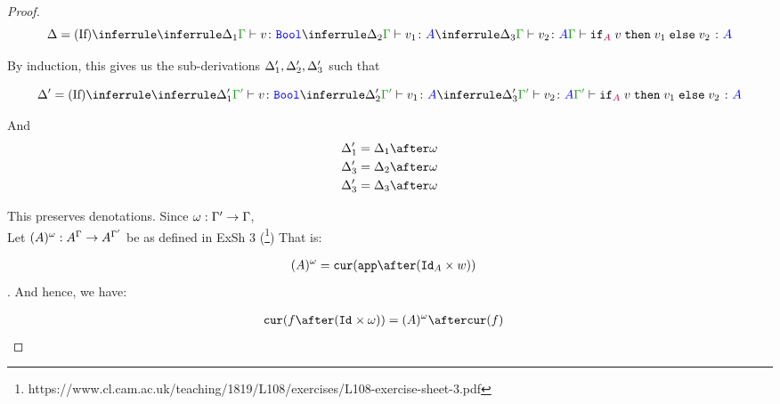 \documentclass{report}
\begin{document}
\begin{framed}
\begin{proof}
        
        \begin{equation}
            \D = \ntreeruleIII{\vif}{
                \treeruleI{\D_1}{\typerelation{\G}{v}{\B}}
                }{
                \treeruleI{\D_2}{\typerelation{\G}{v_1}{ A}}
                }{
                \treeruleI{\D_3}{\typerelation{\G}{v_2}{ A}}
            }{
                \typerelation{\G}{\pifthenelse{A}{v}{v_1}{v_2}}{ A}
            }
        \end{equation}
        
        By induction, this gives us the sub-derivations $\Delta_1', \Delta_2', \Delta_3'$ such that
        
        \begin{equation}
            \D' = \ntreeruleIII{\vif}{
                \treeruleI{\D_1'}{\typerelation{\G'}{v}{\B}}
                }{
                \treeruleI{\D_2'}{\typerelation{\G'}{v_1}{ A}}
                }{
                \treeruleI{\D_3'}{\typerelation{\G'}{v_2}{ A}}
            }{
                \typerelation{\G'}{\pifthenelse{A}{v}{v_1}{v_2}}{ A}
            }
        \end{equation}
        
        And 
        \begin{align*}
            \D_1' & =\D_1 \after \w\\
            \D_3' & =\D_2 \after \w\\
            \D_3' & =\D_3 \after \w 
        \end{align*}
        
        
        This preserves denotations.
        Since $\omega: \Gamma' \rightarrow \Gamma$, \\
        Let $(A)^{\omega}: A^{\Gamma}\rightarrow A^{\Gamma'}$ be as defined in ExSh 3 (\footnote{https://www.cl.cam.ac.uk/teaching/1819/L108/exercises/L108-exercise-sheet-3.pdf})
        That is:
        
        \begin{align*}
            (A)^{\w} & = \cur{\app\after(\Id{A}\times w)}
        \end{align*}.
        And hence, we have:
        
        \begin{align*}
            \cur{f\after(\Id{}\times \w)} & = (A)^{\w} \after\cur{f}
        \end{align*}
        

\end{proof}
\end{framed}
\end{document}
